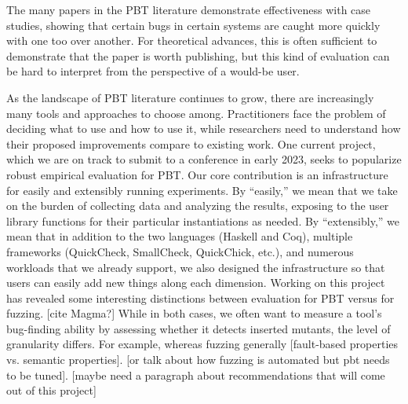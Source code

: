 
The many papers in the PBT literature demonstrate effectiveness with case
studies, showing that certain bugs in certain systems are caught more quickly
with one too over another. For theoretical advances, this is often sufficient
to demonstrate that the paper is worth publishing, but this kind of evaluation
can be hard to interpret from the perspective of a would-be user. 

As the landscape of PBT literature continues to grow, there are increasingly many tools and approaches to choose among. Practitioners face the problem of deciding what to use and how to use it, while researchers need to understand how their proposed improvements compare to existing work.
One current project, which we are on track to submit to a conference in early 2023, seeks to popularize robust empirical evaluation for PBT. Our core contribution is an infrastructure for easily and extensibly running experiments. By “easily,” we mean that we take on the burden of collecting data and analyzing the results, exposing to the user library functions for their particular instantiations as needed. By “extensibly,” we mean that in addition to the two languages (Haskell and Coq), multiple frameworks (QuickCheck, SmallCheck, QuickChick, etc.), and numerous workloads that we already support, we also designed the infrastructure so that users can easily add new things along each dimension.
Working on this project has revealed some interesting distinctions between evaluation for PBT versus for fuzzing. [cite Magma?] While in both cases, we often want to measure a tool’s bug-finding ability by assessing whether it detects inserted mutants, the level of granularity differs. For example, whereas fuzzing generally [fault-based properties vs. semantic properties]. [or talk about how fuzzing is automated but pbt needs to be tuned].
[maybe need a paragraph about recommendations that will come out of this project]

